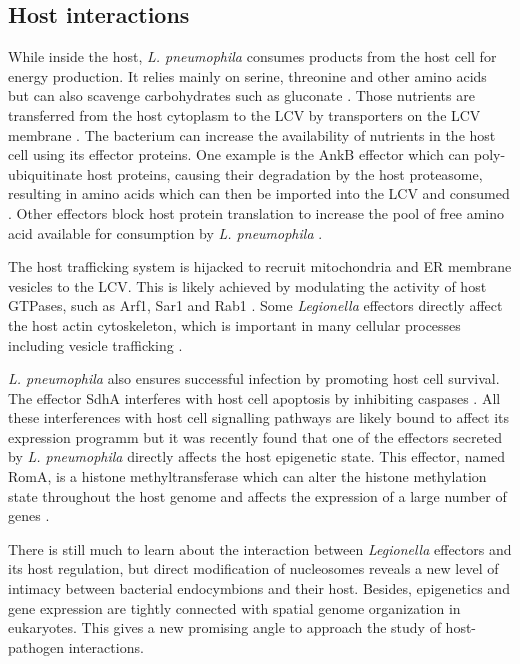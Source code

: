 \subsection{Host interactions}

While inside the host, \textit{L. pneumophila} consumes products from the host cell for energy production. It relies mainly on serine, threonine and other amino acids but can also scavenge carbohydrates such as gluconate \cite{bruggemannVirulenceStrategiesInfecting2006}. Those nutrients are transferred from the host cytoplasm to the LCV by transporters on the LCV membrane \cite{wielandIntracellularMultiplicationLegionella2005}. The bacterium can increase the availability of nutrients in the host cell using its effector proteins. One example is the AnkB effector which can poly-ubiquitinate host proteins, causing their degradation by the host proteasome, resulting in amino acids which can then be imported into the LCV and consumed \cite{priceMolecularMimicryFBox2009}.
Other effectors block host protein translation to increase the pool of free amino acid available for consumption by \textit{L. pneumophila} \cite{deleonPositiveNegativeRegulation2017}.

The host trafficking system is hijacked to recruit mitochondria and \acrfull{ER} membrane vesicles to the LCV. This is likely achieved by modulating the activity of host GTPases, such as Arf1, Sar1 and Rab1 \cite{isbergLegionellaPneumophilaReplication2009}. Some \textit{Legionella} effectors directly affect the host actin cytoskeleton, which is important in many cellular processes including vesicle trafficking \citep{liuLegionellaEffectorDisrupts2017,francoLegionellaPneumophilaEffector2012}.

\textit{L. pneumophila} also ensures successful infection by promoting host cell survival. The effector SdhA interferes with host cell apoptosis by inhibiting caspases \cite{lagunaLegionellaPneumophilatranslocatedSubstrate2006}. All these interferences with host cell signalling pathways are likely bound to affect its expression programm but it was recently found that one of the effectors secreted by \textit{L. pneumophila} directly affects the host epigenetic state. This effector, named RomA, is a histone methyltransferase which can alter the histone methylation state throughout the host genome and affects the expression of a large number of genes \cite{rolandoLegionellaPneumophilaEffector2013}.

There is still much to learn about the interaction between \textit{Legionella} effectors and its host regulation, but direct modification of nucleosomes reveals a new level of intimacy between bacterial endocymbions and their host. Besides, epigenetics and gene expression are tightly connected with spatial genome organization in eukaryotes. This gives a new promising angle to approach the study of host-pathogen interactions.

